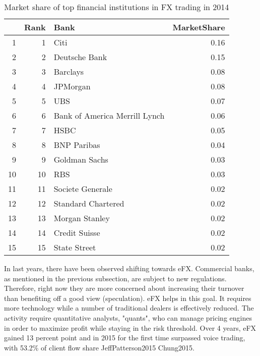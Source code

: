 \documentclass{article}\usepackage[]{graphicx}\usepackage[]{color}
\begin{document}
\begin{table}[ht]
\centering
\begin{tabular}{rrlr}
  \hline
 & Rank & Bank & MarketShare \\ 
  \hline
1 &   1 & Citi & 0.16 \\ 
  2 &   2 & Deutsche Bank & 0.15 \\ 
  3 &   3 & Barclays & 0.08 \\ 
  4 &   4 & JPMorgan & 0.08 \\ 
  5 &   5 & UBS & 0.07 \\ 
  6 &   6 & Bank of America Merrill Lynch & 0.06 \\ 
  7 &   7 & HSBC & 0.05 \\ 
  8 &   8 & BNP Paribas & 0.04 \\ 
  9 &   9 & Goldman Sachs & 0.03 \\ 
  10 &  10 & RBS & 0.03 \\ 
  11 &  11 & Societe Generale & 0.02 \\ 
  12 &  12 & Standard Chartered & 0.02 \\ 
  13 &  13 & Morgan Stanley & 0.02 \\ 
  14 &  14 & Credit Suisse & 0.02 \\ 
  15 &  15 & State Street & 0.02 \\ 
   \hline
\end{tabular}
\caption{Market share of top financial institutions in FX trading in 2014} 
\label{table_turnover_banks}
\end{table}


In last years, there have been observed shifting towards eFX. Commercial banks, as mentioned in the previous subsection,
are subject to new regulations. Therefore, right now they are more concerned about increasing their turnover
than benefiting off a good view (speculation). eFX helps in this goal. It requires more technology while a number of traditional dealers
is effectively reduced. The activity require quantitative analysts, "quants", who can manage pricing engines in order to maximize profit while staying in the risk threshold.
Over 4 years, eFX gained 13 percent point and in 2015 for the first time surpassed voice trading, with 53.2\% of client flow share  JeffPatterson2015 Chung2015.
\end{document}
